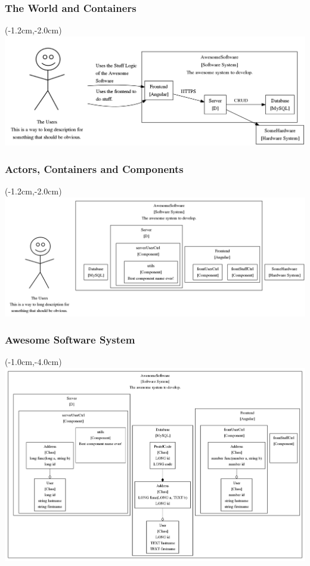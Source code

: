 \documentclass[xelatex,13pt]{beamer}
\begin{document}
\begin{frame}
	\frametitle{The World and Containers}
	\begin{textblock*}{0cm}(-1.2cm,-2.0cm)
		\includegraphics[width=1.0\paperwidth]{theworldandcontainer.png}
	\end{textblock*}
\end{frame}

\begin{frame}
	\frametitle{Actors, Containers and Components}
	\begin{textblock*}{0cm}(-1.2cm,-2.0cm)
		\includegraphics[width=1.0\paperwidth]{theworldcontainercomponents.png}
	\end{textblock*}
\end{frame}

\begin{frame}
	\frametitle{Awesome Software System}
	\begin{textblock*}{0cm}(-1.0cm,-4.0cm)
		\includegraphics[width=1.0\paperwidth]{AwesomeSoftware.png}
	\end{textblock*}
\end{frame}
\end{document}
